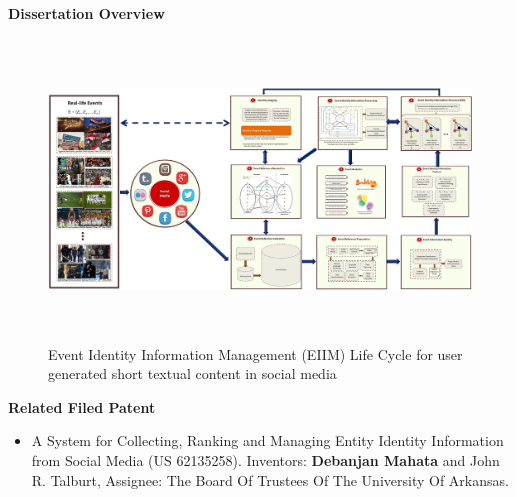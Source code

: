 \documentclass[11pt, oneside]{Thesis} %
\begin{document}


\pagestyle{empty} %



\clearpage %

\begin{center} \textbf{\Huge Dissertation Overview} \end{center}


\begin{figure}[htbp]
  \caption{Event Identity Information Management (EIIM) Life Cycle for user generated short textual content in social media}
  \centering
    \includegraphics[width=15.5cm,height=8cm]{Figures/EIIMComponents/fullFramework.jpg}
\end{figure}

\textbf{\LARGE Related Filed Patent}
\begin{itemize}
\item A System for Collecting, Ranking and Managing Entity Identity Information from Social Media (US 62135258). Inventors: \textbf{Debanjan Mahata} and John R. Talburt, Assignee: The Board Of Trustees Of The University Of Arkansas.
\end{itemize}
\end{document}
